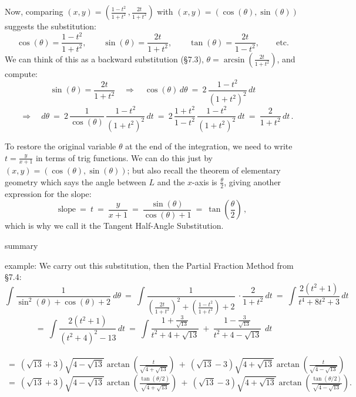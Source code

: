 \documentclass[11pt]{article}
\newcommand{\ds}{\displaystyle}
\newcommand{\ts}{\textstyle}
\begin{document}
Now, comparing $(x,y)  = \left(\frac{1-t^2}{1+t^2}\,, \frac{2t}{1+t^2}\right)$ 
with  $(x,y)=(\cos(\theta),\sin(\theta))$ suggests the substitution:
$$
\cos(\theta) = \frac{1-t^2}{1+t^2}, \qquad
\sin(\theta) =  \frac{2t}{1+t^2}, \qquad
\tan(\theta) = \frac{2t}{1-t^2}, \qquad \text{etc.}
$$
We can think of this as a backward substitution (\S7.3),
$\theta = \arcsin\!\left(\!\frac{2t}{1+t^2}\!\right)$,
and compute:
$$
\sin(\theta) =  \frac{2t}{1+t^2}
\quad\Longrightarrow\quad
\cos(\theta)\,d\theta \ =\ 2\,\frac{1-t^2}{(1+t^2)^2}\,dt
$$
$$
\quad\Longrightarrow\quad
d\theta \ =\ 2\,\frac{1}{\cos(\theta)}\,\frac{1-t^2}{(1+t^2)^2}\,dt
\ =\
2\,\frac{1+t^2}{1-t^2}\,\frac{1-t^2}{(1+t^2)^2}\,dt
\ =\
\frac{2}{1+t^2}\,dt\,.
$$
\vspace{.1em}

To restore the original variable $\theta$ at the end of the integration, 
we need to write $t=\frac{y}{x+1}$ in terms of trig functions.  
We can do this just by $(x,y)=(\cos(\theta),\sin(\theta))$;
but also recall the theorem of elementary geometry which says the angle between $L$ and the $x$-axis is $\frac\theta2$, giving another expression for the slope:
$$
\text{slope} \ =\ t \ =\ \frac{y}{x{+}1}
\ =\ 
\frac{\sin(\theta)}{\cos(\theta)+1}
\ =\
\tan\!\left(\frac\theta2\right)
\,,
$$
which is why we call it the Tangent Half-Angle Substitution.

\newpage

\centerline{\sc summary} 

\vspace{.5em}

\boxed{$$ \ds
\ \ \ \cos(\theta) = \frac{1-t^2}{1+t^2}, \ \  \ 
 \sin(\theta) =\frac{2t}{1+t^2}, \ \ \ 
d\theta = \frac{2}{1+t^2}\,dt, \ \ \ 
t = \frac{\sin(\theta)}{\cos(\theta)+1}
= \tan\!\left(\frac\theta2\right). \ \ \ 
$$}

\vspace{1.5em}

\noindent
{\sc example:} We carry out this substitution, then the
Partial Fraction Method from \S7.4:
$$
\int\!\!\frac{1}{\sin^2(\theta) + \cos(\theta) + 2}\ d\theta
\ =\ 
\int\!\!\frac{1} { \left(\!\frac{2t}{1{+}t^2}\!\right)^{\!\!2} + \left(\!\frac{1{-}t^2}{1{+}t^2}\!\right) + 2}\ 
\cdot \frac{2}{1{+}t^2}\,dt
\ =\
\int\!\! \frac{2(t^2{+}1)}{t^4 + 8t^2 + 3}\,dt
$$
$$
\ =\
\int\!\! \frac{2(t^2{+}1)}{(t^2{+}4)^2-13}\,dt
\ =\
\int  
\frac {1+\frac3{\sqrt{13}}} {t^2{+}4{+}\sqrt{13}}
\ +\
\frac {1-\frac3{\sqrt{13}}} {t^2{+}4{-}\sqrt{13}}
\ \,dt
$$
\\[-1em]
$$
\ =\ 
(\sqrt{13}{+}3){\ts\sqrt{4{-}\sqrt{13}}}\arctan\!\left(\!\tfrac{t}{\sqrt{4+\sqrt{13}}}\right)
\ +\
(\sqrt{13}{-}3){\ts\sqrt{4{+}\sqrt{13}}}\arctan\!\left(\!\tfrac{t}{\sqrt{4-\sqrt{13}}}\right)
$$
$$
\ =\ 
(\sqrt{13}{+}3){\ts\sqrt{4{-}\sqrt{13}}}\arctan\!\left(\!\tfrac{\tan(\theta/2)}{\sqrt{4+\sqrt{13}}}\right)
\ +\
(\sqrt{13}{-}3){\ts\sqrt{4{+}\sqrt{13}}}\arctan\!\left(\!\tfrac {\tan(\theta/2)}{\sqrt{4-\sqrt{13}}}\right).\!\!
$$
\\[-1.5em]
\end{document}
